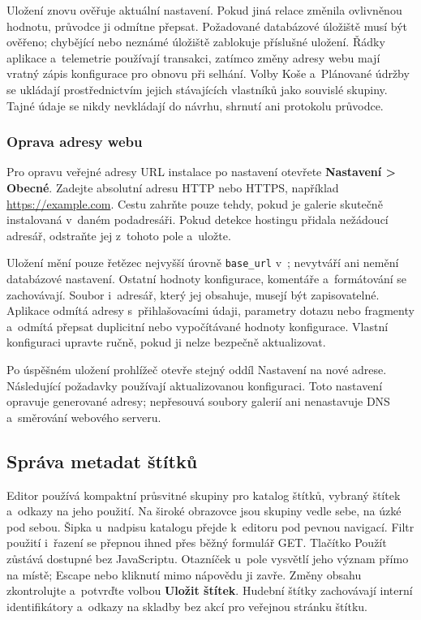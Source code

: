 \documentclass[11pt,a4paper]{article}
\newcommand{\filepath}[1]{\path{#1}}
\newcommand{\ui}[1]{\textbf{#1}}
\newcommand{\codeword}[1]{\nolinkurl{#1}}
\begin{document}
Uložení znovu ověřuje aktuální nastavení. Pokud jiná relace změnila ovlivněnou
hodnotu, průvodce ji odmítne přepsat. Požadované databázové úložiště musí být
ověřeno; chybějící nebo neznámé úložiště zablokuje příslušné uložení. Řádky
aplikace a~telemetrie používají transakci, zatímco změny adresy webu mají vratný
zápis konfigurace pro obnovu při selhání. Volby Koše a~Plánované údržby se
ukládají prostřednictvím jejich stávajících vlastníků jako souvislé skupiny.
Tajné údaje se nikdy nevkládají do návrhu, shrnutí ani protokolu průvodce.

\subsubsection{Oprava adresy webu}

Pro opravu veřejné adresy URL instalace po nastavení otevřete \ui{Nastavení >
Obecné}. Zadejte absolutní adresu HTTP nebo HTTPS, například
\url{https://example.com}. Cestu zahrňte pouze tehdy, pokud je galerie skutečně
instalovaná v~daném podadresáři. Pokud detekce hostingu přidala nežádoucí
adresář, odstraňte jej z~tohoto pole a~uložte.

Uložení mění pouze řetězec nejvyšší úrovně \codeword{base_url}
v~\filepath{config.php}; nevytváří ani nemění databázové nastavení. Ostatní
hodnoty konfigurace, komentáře a~formátování se zachovávají. Soubor i~adresář,
který jej obsahuje, musejí být zapisovatelné. Aplikace odmítá adresy
s~přihlašovacími údaji, parametry dotazu nebo fragmenty a~odmítá přepsat
duplicitní nebo vypočítávané hodnoty konfigurace. Vlastní konfiguraci upravte
ručně, pokud ji nelze bezpečně aktualizovat.

Po úspěšném uložení prohlížeč otevře stejný oddíl Nastavení na nové adrese.
Následující požadavky používají aktualizovanou konfiguraci. Toto nastavení
opravuje generované adresy; nepřesouvá soubory galerií ani nenastavuje DNS
a~směrování webového serveru.

\subsection{Správa metadat štítků}

Editor používá kompaktní průsvitné skupiny pro katalog štítků, vybraný štítek
a~odkazy na jeho použití. Na široké obrazovce jsou skupiny vedle sebe, na úzké
pod sebou. Šipka u~nadpisu katalogu přejde k~editoru pod pevnou navigací.
Filtr použití i~řazení se přepnou ihned přes běžný formulář GET.
Tlačítko Použít zůstává dostupné bez JavaScriptu. Otazníček u~pole
vysvětlí jeho význam přímo na místě; Escape nebo kliknutí mimo nápovědu ji
zavře. Změny obsahu zkontrolujte a~potvrďte volbou \ui{Uložit štítek}.
Hudební štítky zachovávají interní identifikátory a~odkazy na skladby bez akcí
pro veřejnou stránku štítku.
\end{document}

